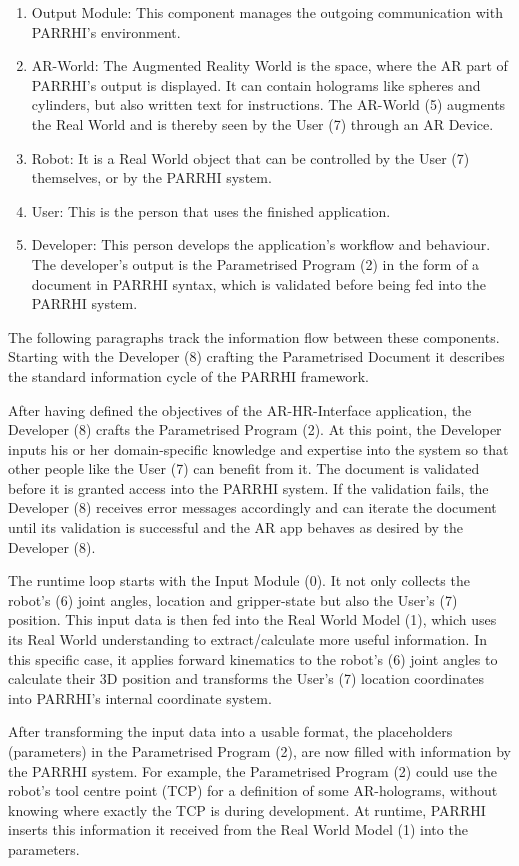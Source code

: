 \begin{enumerate}
	\item Output Module: This component manages the outgoing communication with PARRHI's environment. 
	\item AR-World: The Augmented Reality World is the space, where the AR part of PARRHI's output is displayed. It can contain holograms like spheres and cylinders, but also written text for instructions. The AR-World (5) augments the Real World and is thereby seen by the User (7) through an AR Device.
	\item Robot: It is a Real World object that can be controlled by the User (7) themselves, or by the PARRHI system.
	\item User: This is the person that uses the finished application.
	\item Developer: This person develops the application’s workflow and behaviour. The developer’s output is the Parametrised Program (2) in the form of a document in PARRHI syntax, which is validated before being fed into the PARRHI system.
\end{enumerate}

The following paragraphs track the information flow between these components. Starting with the Developer (8) crafting the Parametrised Document it describes the standard information cycle of the PARRHI framework.

After having defined the objectives of the AR-HR-Interface application, the Developer (8) crafts the Parametrised Program (2). At this point, the Developer inputs his or her domain-specific knowledge and expertise into the system so that other people like the User (7) can benefit from it. The document is validated before it is granted access into the PARRHI system. If the validation fails, the Developer (8) receives error messages accordingly and can iterate the document until its validation is successful and the AR app behaves as desired by the Developer (8).

The runtime loop starts with the Input Module (0). It not only collects the robot's (6) joint angles, location and gripper-state but also the User's (7) position. This input data is then fed into the Real World Model (1), which uses its Real World understanding to extract/calculate more useful information. In this specific case, it applies forward kinematics to the robot's (6) joint angles to calculate their 3D position and transforms the User's (7) location coordinates into PARRHI's internal coordinate system. 

After transforming the input data into a usable format, the placeholders (parameters) in the Parametrised Program (2), are now filled with information by the PARRHI system. For example, the Parametrised Program (2) could use the robot's tool centre point (TCP) for a definition of some AR-holograms, without knowing where exactly the TCP is during development. At runtime, PARRHI inserts this information it received from the Real World Model (1) into the parameters. 

